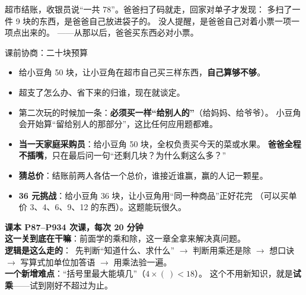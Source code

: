 
\begin{blunder}
超市结账，收银员说“一共 78”。爸爸扫了码就走，回家对单子才发现：
多扫了一件 9 块的东西，是爸爸自己放进袋子的。
没人提醒，是爸爸自己对着小票一项一项点出来的。
——从那以后，爸爸买东西必对小票。
\end{blunder}

\begin{gamble}{课前协商：二十块预算}
\begin{itemize}
  \item 给小豆角 50 块，让小豆角在超市自己买三样东西，\textbf{自己算够不够}。
  \item 超支了怎么办、省下来的归谁，现在就谈定。
  \item 第二次玩的时候加一条：\textbf{必须买一样“给别人的”}（给妈妈、给爷爷）。
        小豆角会开始算“留给别人的那部分”，这比任何应用题都难。
\end{itemize}
\negolines
\end{gamble}

\begin{bonus}
\begin{itemize}
  \item \textbf{当一天家庭采购员}：给小豆角 50 块，全权负责买今天的菜或水果。
        \textbf{爸爸全程不插嘴}，只在最后问一句“还剩几块？为什么剩这么多？”
  \item \textbf{猜总价}：结账前两人各估一个总价，谁接近谁赢，赢的人记一颗星。
  \item \textbf{36 元挑战}：给小豆角 36 块，让小豆角用“同一种商品”正好花完
        （可以买单价 3、4、6、9、12 的东西）。这题能玩很久。
\end{itemize}
\end{bonus}

\begin{unitinfo}
\textbf{课本 P87--P93}\quad \textbf{4 次课，每次 20 分钟} \\[4pt]
\textbf{这一关到底在干嘛}：前面学的乘和除，这一章全拿来解决真问题。\\
\textbf{逻辑是这么走的}：\ 先判断“知道什么、求什么” $\to$ 判断用乘还是除
$\to$ 想口诀 $\to$ 写算式加单位加答语 $\to$ 用乘法验一遍。\\
\textbf{一个新增难点}：“括号里最大能填几”（$4\times(\ )<18$）。
这个不用新知识，就是\textbf{试乘}——试到刚好不超过为止。
\end{unitinfo}

